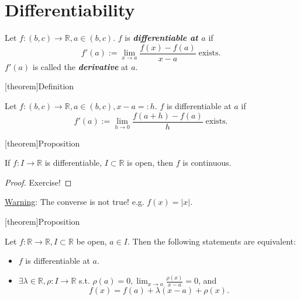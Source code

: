 \documentclass[12pt]{report}
\theoremstyle{definition}
\begin{document}
\section{Differentiability}

\begin{differentiable}
    Let $f:(b,c) \rightarrow{} \mathbb{R}, a \in (b,c)$.
    $f$ is \textbf{\emph{differentiable at $a$}} if\[
        f'(a) := \lim_{x\rightarrow{}a} \frac{f(x) - f(a)}{x - a} \;\text{exists.}\;
    \]$f'(a)$ is called the \textbf{\emph{derivative}} at $a$.
\end{differentiable}

[theorem]{Definition}
\begin{differentiable alternative def}
    Let $f:(b,c) \rightarrow{} \mathbb{R}, a \in (b,c), x - a =: h$.
    $f$ is differentiable at $a$ if\[
        f'(a) := \lim_{h\rightarrow{}0} \frac{f(a + h) - f(a)}{h} \;\text{exists.}\;
    \]
\end{differentiable alternative def}

[theorem]{Proposition}
\begin{differentiable means continuous}
    If $f:I\rightarrow{}\mathbb{R}$ is differentiable, $I \subset \mathbb{R}$ is open, 
    then $f$ is continuous.
\end{differentiable means continuous}

\begin{proof}
    Exercise!
\end{proof}

\underline{Warning}: The converse is not true! e.g. $f(x) = |x|$.

[theorem]{Proposition}
\begin{construct secant around a}
    Let $f:\mathbb{R}\rightarrow{}\mathbb{R}, I \subset \mathbb{R}$ be open, $a \in I$.
    Then the following statements are equivalent:
    \begin{itemize}
            \item $f$ is differentiable at $a$.
            \item $\exists \lambda \in \mathbb{R}, \rho:I\rightarrow{}\mathbb{R}$
            s.t. $\rho (a) = 0, \lim_{x\rightarrow{}a} \frac{\rho(x)}{x-a} = 0$, and\[
                    f(x) = f(a) + \lambda(x-a) + \rho(x).
                \]
    \end{itemize}
\end{construct secant around a}
\end{document}
